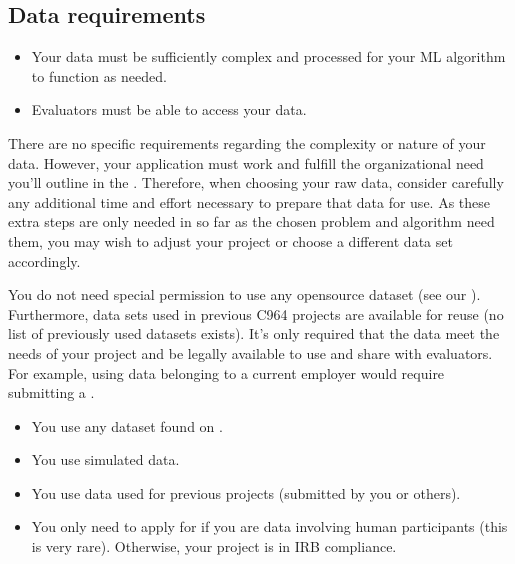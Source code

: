 \documentclass[letterpaper,10pt,english]{jupyterBook}
\begin{document}
\subsection{Data requirements}
\label{\detokenize{task2_c/task2_part_c:data-requirements}}\label{\detokenize{task2_c/task2_part_c:task2c-data-requirements}}\begin{itemize}
\item {} 
\sphinxAtStartPar
Your data must be sufficiently complex and processed for your ML algorithm to function as needed.

\item {} 
\sphinxAtStartPar
Evaluators must be able to access your data.

\end{itemize}

\sphinxAtStartPar
There are no specific requirements regarding the complexity or nature of your data. However, your application must work and fulfill the organizational need you’ll outline in the {\hyperref[\detokenize{task2_doc/task2_doc:task2-doc}]{}}. Therefore, when choosing your raw data, consider carefully any additional time and effort necessary to prepare that data for use. As these extra steps are only needed in so far as the chosen problem and algorithm need them, you may wish to adjust your project or choose a different data set accordingly.

\sphinxAtStartPar
You do not need special permission to use any open\sphinxhyphen{}source dataset (see our {\hyperref[\detokenize{resources:resources-task1-data}]{}}). Furthermore, data sets used in previous C964 projects are available for reuse (no list of previously used datasets exists). It’s only required that the data meet the needs of your project and be legally available to use and share with evaluators. For example, using data belonging to a current employer would require submitting a .
\begin{itemize}
\item {} 
\sphinxAtStartPar
You  use any dataset found on .

\item {} 
\sphinxAtStartPar
You  use simulated data.

\item {} 
\sphinxAtStartPar
You  use data used for previous projects (submitted by you or others).

\item {} 
\sphinxAtStartPar
You only need to apply for  if you are  data involving human participants (this is very rare). Otherwise, your project is in IRB compliance.

\end{itemize}
\end{document}

